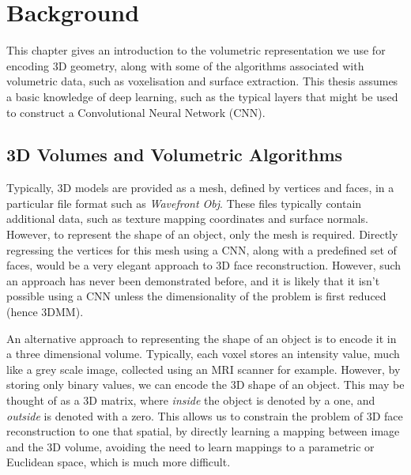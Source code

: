 \graphicspath{{chapter_background/}}
\chapter{Background}
\label{chapter:background}

This chapter gives an introduction to the volumetric representation we
use for encoding 3D geometry, along with some of the algorithms
associated with volumetric data, such as voxelisation and surface
extraction. This thesis assumes a basic knowledge of deep learning,
such as the typical layers that might be used to construct a
Convolutional Neural Network (CNN).

\section{3D Volumes and Volumetric Algorithms}
\label{sec:background:volumes}

Typically, 3D models are provided as a mesh, defined by vertices and
faces, in a particular file format such as \textit{Wavefront
  Obj}. These files typically contain additional data, such as texture
mapping coordinates and surface normals. However, to represent the
shape of an object, only the mesh is required. Directly regressing the
vertices for this mesh using a CNN, along with a predefined set of
faces, would be a very elegant approach to 3D face
reconstruction. However, such an approach has never been demonstrated
before, and it is likely that it isn't possible using a CNN unless the
dimensionality of the problem is first reduced (hence 3DMM).

An alternative approach to representing the shape of an object is to
encode it in a three dimensional volume. Typically, each voxel stores
an intensity value, much like a grey scale image, collected using an
MRI scanner for example. However, by storing only binary values, we
can encode the 3D shape of an object. This may be thought of as a 3D
matrix, where \textit{inside} the object is denoted by a one, and
\textit{outside} is denoted with a zero. This allows us to constrain
the problem of 3D face reconstruction to one that spatial, by directly
learning a mapping between image and the 3D volume, avoiding the need
to learn mappings to a parametric or Euclidean space, which is much
more difficult.

